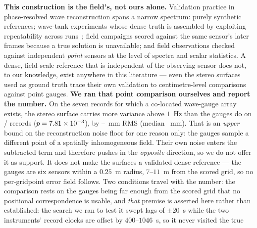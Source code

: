\documentclass[review]{elsarticle}
\begin{document}
\textbf{This construction is the field's, not ours alone.} Validation practice in
phase-resolved wave reconstruction spans a narrow spectrum: purely synthetic references;
wave-tank experiments whose dense truth is assembled by exploiting repeatability across
runs~\citep{desmars2020}; field campaigns scored against the same sensor's later frames
because a true solution is unavailable; and field observations checked against
independent \emph{point} sensors at the level of spectra and scalar statistics. A dense,
field-scale reference that is independent of the observing sensor does not, to our
knowledge, exist anywhere in this literature --- even the stereo surfaces used as ground
truth trace their own validation to centimetre-level comparisons against point gauges.
\textbf{We ran that point comparison ourselves and report the number.} On the seven
records for which a co-located wave-gauge array exists, the stereo surface carries more
variance above $1$~Hz than the gauges do on \RTwoBBetter{}/\RTwoBN{} records
($p = 7.81\times 10^{-3}{}$), by \RTwoBFloorMin{}--\RTwoBFloorMax{}~mm RMS (median
\RTwoBFloorMed{}~mm). %
That is an \emph{upper} bound on the reconstruction noise floor for one reason only:
the gauges sample a different point of a spatially inhomogeneous field. Their own noise
enters the subtracted term and therefore pushes in the \emph{opposite} direction, so we
do not offer it as support. It does not make the surfaces a validated dense reference --- the
gauges are six sensors within a $0.25$~m radius, $7$--$11$~m from the scored grid, so no
per-gridpoint error field follows. Two conditions travel with the number: the comparison
rests on the gauges being far enough from the scored grid that no positional
correspondence is usable, and \emph{that} premise is asserted here rather than
established: the search we ran to test it swept lags of $\pm 20$~s while the two
instruments' record clocks are offset by $400$--$1046$~s, so it never visited the true
\end{document}
